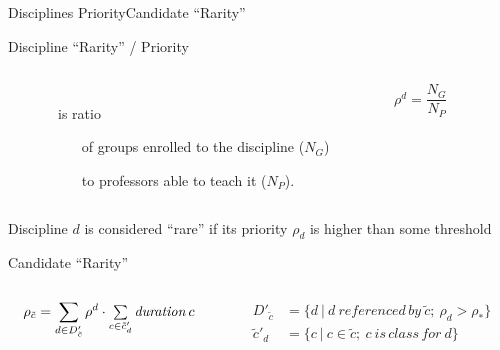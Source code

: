 \begin{frame}{Disciplines Priority}{Candidate ``Rarity''}
  \begin{block}{Discipline ``Rarity'' / Priority}
    \begin{columns}
      \begin{column}{-.5cm}\end{column}
      \begin{column}{.65\textwidth}\\
        is ratio
        \begin{itemize}
          \item[of] groups enrolled to the discipline ($N_G$)
          \item[to] professors able to teach it ($N_P$).
        \end{itemize}
      \end{column}
      \begin{column}{.1\textwidth}
        $$\rho^d = \dfrac{N_G}{N_P}$$
      \end{column}
      \begin{column}{.1\textwidth}\end{column}
    \end{columns}
    \bigskip
    Discipline $d$ is considered \alert{``rare''} if its priority
    $\rho_d$ is higher than some threshold
  \end{block}
  \begin{block}{Candidate ``Rarity''}
    \begin{columns}
      \begin{column}{.4\textwidth}
        \bigskip
        $$\rho_{\tilde{c}} = \sum\limits_{d \in D'_{\tilde{c}}}
                \rho^d \cdot \mathsmaller{ \sum\limits_{c \in \tilde{c}'_d}
                                     \mathit{duration}\, c }$$
      \end{column}
      \begin{column}{.4\textwidth}
        \begin{align*}
          D'_{\tilde{c}} &= \lbrace d ~|~ d ~\mathit{referenced\,by}~ \tilde{c};~
                                        \rho_d > \rho_* \rbrace\\
          \tilde{c}'_d &= \lbrace c ~|~ c \in \tilde{c};~ c ~\mathit{is\,class\,for}~ d \rbrace
        \end{align*}
      \end{column}
    \end{columns}
  \end{block}
\end{frame}
